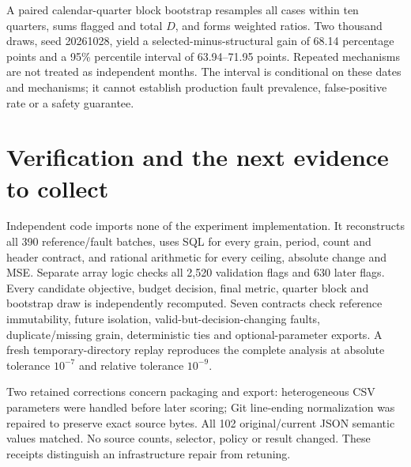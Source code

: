 \documentclass[11pt]{article}
\begin{document}
A paired calendar-quarter block bootstrap resamples all cases within ten quarters, sums flagged and total $D$, and forms weighted ratios. Two thousand draws, seed 20261028, yield a selected-minus-structural gain of 68.14 percentage points and a 95\% percentile interval of 63.94--71.95 points. Repeated mechanisms are not treated as independent months. The interval is conditional on these dates and mechanisms; it cannot establish production fault prevalence, false-positive rate or a safety guarantee.
\section{Verification and the next evidence to collect}
Independent code imports none of the experiment implementation. It reconstructs all 390 reference/fault batches, uses SQL for every grain, period, count and header contract, and rational arithmetic for every ceiling, absolute change and MSE. Separate array logic checks all 2,520 validation flags and 630 later flags. Every candidate objective, budget decision, final metric, quarter block and bootstrap draw is independently recomputed. Seven contracts check reference immutability, future isolation, valid-but-decision-changing faults, duplicate/missing grain, deterministic ties and optional-parameter exports. A fresh temporary-directory replay reproduces the complete analysis at absolute tolerance $10^{-7}$ and relative tolerance $10^{-9}$.

Two retained corrections concern packaging and export: heterogeneous CSV parameters were handled before later scoring; Git line-ending normalization was repaired to preserve exact source bytes. All 102 original/current JSON semantic values matched. No source counts, selector, policy or result changed. These receipts distinguish an infrastructure repair from retuning.
\end{document}
